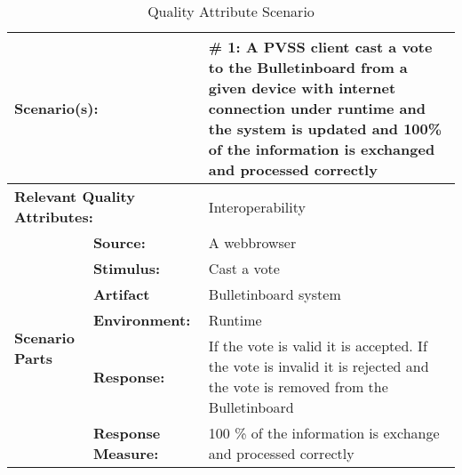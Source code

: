 \begin{table}[H]
\begin{center}
\begin{tabular}{|p{0.3cm}|p{2.5cm}|p{8cm}|}
  \hline
  \multicolumn{2}{|p{3cm}|}{\bfseries Scenario(s):} & \#  1: A PVSS client cast a vote to the Bulletinboard from a given device with internet connection  under runtime and the system is updated and 100\% of the information is exchanged  and processed correctly\\
  \hline
  \multicolumn{2}{|p{3cm}|}{\bfseries Relevant Quality Attributes:} & Interoperability\\
  \hline
  \multirow{6}{*}{\begin{sideways}{\bfseries Scenario Parts}\end{sideways}}
  & {\bfseries Source:} & A webbrowser \\
  \cline{2-3}
  & {\bfseries Stimulus:} & Cast a vote \\
  \cline{2-3}
  & {\bfseries Artifact} &  Bulletinboard system \\
  \cline{2-3}
  & {\bfseries Environment:} &  Runtime \\
  \cline{2-3}
  & {\bfseries Response:} &  If the vote is valid it is accepted. If the vote is invalid it is rejected and the vote is removed from the Bulletinboard \\
  \cline{2-3}
  & {\bfseries Response Measure:} & 100 \% of the information is exchange and processed correctly \\
  \hline
\end{tabular}
\caption{Quality Attribute Scenario}
\end{center}
\end{table}


